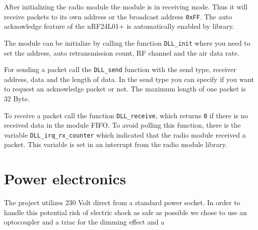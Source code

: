 \documentclass[11pt]{article}
\begin{document}
   After initializing the radio module the module is in receiving mode. Thus it will receive packets to its own address or the broadcast address \texttt{0xFF}. The auto acknowledge feature of the nRF24L01+ is automatically enabled by library.
   
   The module can be initialize by calling the function \texttt{DLL\_init} where you need to set the address, auto retransmission count, RF channel and the air data rate.
   
   For sending a packet call the \texttt{DLL\_send} function with the send type, receiver address, data and the length of data. In the send type you can specify if you want to request an acknowledge packet or not. The maximum length of one packet is 32 Byte.
   
   To receive a packet call the function \texttt{DLL\_receive}, which returns \texttt{0} if there is no received data in the module FIFO. To avoid polling this function, there is the variable \texttt{DLL\_irq\_rx\_counter} which indicated that the radio module received a packet. This variable is set in an interrupt from the radio module library.
   
     \section{Power electronics}
     The project utilizes 230 Volt direct from a standard power socket. In order to handle this potential risk of electric shock as safe as possible we chose to use an optocoupler and a triac for the dimming effect and a 
\end{document}
